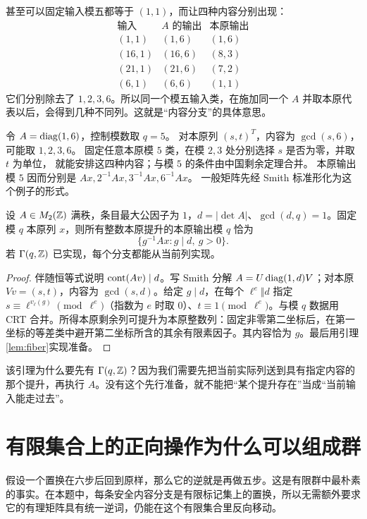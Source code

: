 甚至可以固定输入模五都等于 $(1,1)$，而让四种内容分别出现：
\[
\begin{array}{c|c|c}
\text{输入}&A\text{ 的输出}&\text{本原输出}\\ \hline
(1,1)&(1,6)&(1,6)\\
(16,1)&(16,6)&(8,3)\\
(21,1)&(21,6)&(7,2)\\
(6,1)&(6,6)&(1,1)
\end{array}
\]
它们分别除去了 $1,2,3,6$。所以同一个模五输入类，在施加同一个 $A$ 并取本原代表以后，会得到几种不同列。这就是“内容分支”的具体意思。
\begin{example}[一个内容分支的具体样子]
令 $A=\operatorname{diag}(1,6)$，控制模数取 $q=5$。
对本原列 $(s,t)^T$，内容为 $\gcd(s,6)$，可能取 $1,2,3,6$。
固定任意本原模 $5$ 类，在模 $2,3$ 处分别选择 $s$ 是否为零，并取 $t$ 为单位，
就能安排这四种内容；与模 $5$ 的条件由中国剩余定理合并。
本原输出模 $5$ 因而分别是 $Ax,2^{-1}Ax,3^{-1}Ax,6^{-1}Ax$。
一般矩阵先经 Smith 标准形化为这个例子的形式。
\end{example}
\begin{lemma}[本原化的全部有限分支]\label{lem:content}
设 $A\in M_2(\mathbb Z)$ 满秩，条目最大公因子为 $1$，$d=|\det A|$、$\gcd(d,q)=1$。固定模 $q$ 本原列 $x$，则所有整数本原提升的本原输出模 $q$ 恰为
\begin{equation}\label{eq:content}
\{g^{-1}Ax:g\mid d,\ g>0\}.
\end{equation}
若 $\Gamma(q,\mathbb Z)$ 已实现，每个分支都能从当前列实现。
\end{lemma}
\begin{proof}
伴随恒等式说明 $\operatorname{cont}(Av)\mid d$。写 Smith 分解 $A=U\operatorname{diag}(1,d)V$；对本原 $Vv=(s,t)$，内容为 $\gcd(s,d)$。给定 $g\mid d$，在每个 $\ell^e\Vert d$ 指定 $s\equiv\ell^{v_\ell(g)}\pmod{\ell^e}$（指数为 $e$ 时取 $0$）、$t\equiv1\pmod{\ell^e}$。与模 $q$ 数据用 CRT 合并。所得本原剩余列可提升为本原整数列：固定非零第二坐标后，在第一坐标的等差类中避开第二坐标所含的其余有限素因子。其内容恰为 $g$。最后用引理\ref{lem:fiber}实现准备。
\end{proof}
该引理为什么要先有 $\Gamma(q,\mathbb Z)$？因为我们需要先把当前实际列送到具有指定内容的那个提升，再执行 $A$。没有这个先行准备，就不能把“某个提升存在”当成“当前输入能走过去”。

\section{有限集合上的正向操作为什么可以组成群}
假设一个置换在六步后回到原样，那么它的逆就是再做五步。这是有限群中最朴素的事实。在本题中，每条安全内容分支是有限标记集上的置换，所以无需额外要求它的有理矩阵具有统一逆词，仍能在这个有限集合里反向移动。

